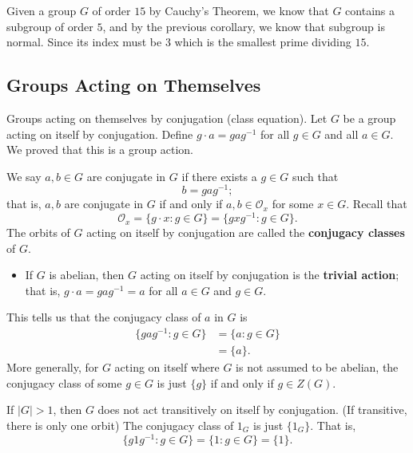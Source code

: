 \begin{eg}
    Given a group \( G  \) of order \( 15  \) by Cauchy's Theorem, we know that \( G  \) contains a subgroup of order \( 5  \), and by the previous corollary, we know that subgroup is normal. Since its index must be \( 3  \) which is the smallest prime dividing \( 15 \).
\end{eg}

\subsection{Groups Acting on Themselves}

Groups acting on themselves by conjugation (class equation). Let \( G  \) be a group acting on itself by conjugation. Define \( g \cdot a =  g a g^{-1} \) for all \( g \in G  \) and all \( a \in G  \). We proved that this is a group action.

\begin{definition}[ ]
    We say \( a,b \in G  \) are conjugate in \( G  \) if there exists a \( g \in G  \) such that 
    \[  b = g a g^{-1}; \]
    that is, \( a,b  \) are conjugate in \( G  \) if and only if \( a,b \in {\mathcal{O}}_{x}  \) for some \( x \in G  \).
Recall that 
\[  {\mathcal{O}}_{x} = \{  g \cdot x : g \in G  \} = \{ g x g^{-1} : g\in  G    \}. \]
The orbits of \( G  \) acting on itself by conjugation are called the \textbf{conjugacy classes} of \( G  \).
\end{definition}

\begin{eg}
   \begin{itemize}
       \item If \( G  \) is abelian, then \( G  \) acting on itself by conjugation is the  \textbf{trivial action}; that is, \( g \cdot a = g a g^{-1} = a  \) for all \( a \in G  \)  and \( g \in G  \).  
   \end{itemize} 
\end{eg}
This tells us that the conjugacy class of \( a  \) in \( G \) is
\begin{align*}
    \{  g a g^{-1 } : g \in G  \} &= \{ a :  g \in G  \}  \\
                                  &= \{  a  \}.
\end{align*}
More generally, for \( G  \) acting on itself where \( G   \) is not assumed to be abelian, the conjugacy class of some \( g \in G  \) is just \( \{  g  \}  \) if and only if \( g  \in Z(G)  \).
\begin{eg}
    If \( | G  |   > 1  \), then \( G  \) does not act transitively on itself by conjugation. (If transitive, there is only one orbit) The conjugacy class of \( {1}_{G} \) is just \( \{  {1}_{G} \}  \). That is, 
    \[  \{  g 1 g^{-1} : g \in G  \} = \{  1 : g \in G  \}  = \{ 1  \}. \]
\end{eg}

